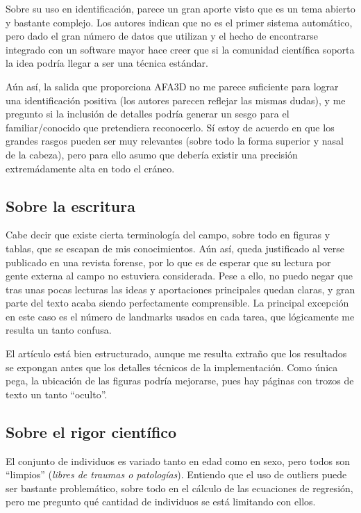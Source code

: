 \documentclass[13pt,a4paper]{article}
\begin{document}
\vspace{\baselineskip}

Sobre su uso en identificación, parece un gran aporte visto que es un tema abierto y bastante complejo. Los autores indican que no es el primer sistema automático, pero dado el gran número de datos que utilizan y el hecho de encontrarse integrado con un software mayor hace creer que si la comunidad científica soporta la idea podría llegar a ser una técnica estándar.

\vspace{\baselineskip}

Aún así, la salida que proporciona AFA3D no me parece suficiente para lograr una identificación positiva (los autores parecen reflejar las mismas dudas), y me pregunto si la inclusión de detalles podría generar un sesgo para el familiar/conocido que pretendiera reconocerlo. Sí estoy de acuerdo en que los grandes rasgos pueden ser muy relevantes (sobre todo la forma superior y nasal de la cabeza), pero para ello asumo que debería existir una precisión extremádamente alta en todo el cráneo.

\subsection{Sobre la escritura}

Cabe decir que existe cierta terminología del campo, sobre todo en figuras y tablas, que se escapan de mis conocimientos. Aún así, queda justificado al verse publicado en una revista forense, por lo que es de esperar que su lectura por gente externa al campo no estuviera considerada. Pese a ello, no puedo negar que tras unas pocas lecturas las ideas y aportaciones principales quedan claras, y gran parte del texto acaba siendo perfectamente comprensible. La principal excepción en este caso es el número de landmarks usados en cada tarea, que lógicamente me resulta un tanto confusa.

El artículo está bien estructurado, aunque me resulta extraño que los resultados se expongan antes que los detalles técnicos de la implementación. Como única pega, la ubicación de las figuras podría mejorarse, pues hay páginas con trozos de texto un tanto ``oculto''.

\subsection{Sobre el rigor científico} %

El conjunto de individuos es variado tanto en edad como en sexo, pero todos son ``limpios'' (\textit{libres de traumas o patologías}). Entiendo que el uso de outliers puede ser bastante problemático, sobre todo en el cálculo de las ecuaciones de regresión, pero me pregunto qué cantidad de individuos se está limitando con ellos.
\end{document}
